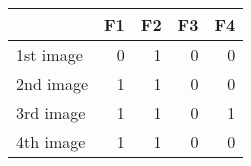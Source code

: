 \begin{tabular}{lrrrr}
\toprule
{} &  F1 &  F2 &  F3 &  F4 \\
\midrule
1st image &   0 &   1 &   0 &   0 \\
2nd image &   1 &   1 &   0 &   0 \\
3rd image &   1 &   1 &   0 &   1 \\
4th image &   1 &   1 &   0 &   0 \\
\bottomrule
\end{tabular}
